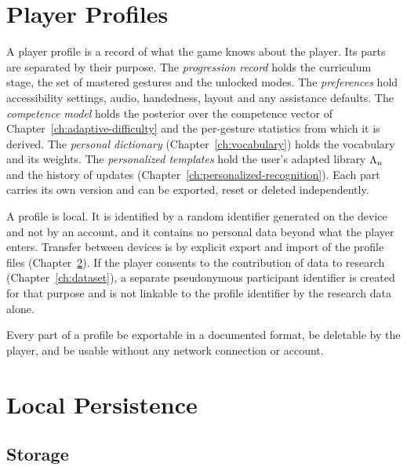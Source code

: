 \chapter{Player Profiles}\label{ch:profiles}

A player profile is a record of what the game knows about the player. Its parts are separated by their purpose. The \emph{progression record} holds the curriculum stage, the set of mastered gestures and the unlocked modes. The \emph{preferences} hold accessibility settings, audio, handedness, layout and any assistance defaults. The \emph{competence model} holds the posterior over the competence vector of Chapter~\ref{ch:adaptive-difficulty} and the per-gesture statistics from which it is derived. The \emph{personal dictionary} (Chapter~\ref{ch:vocabulary}) holds the vocabulary and its weights. The \emph{personalized templates} hold the user's adapted library $\Lambda_u$ and the history of updates (Chapter~\ref{ch:personalized-recognition}). Each part carries its own version and can be exported, reset or deleted independently.

A profile is local. It is identified by a random identifier generated on the device and not by an account, and it contains no personal data beyond what the player enters. Transfer between devices is by explicit export and import of the profile files (Chapter~\ref{ch:persistence}). If the player consents to the contribution of data to research (Chapter~\ref{ch:dataset}), a separate pseudonymous participant identifier is created for that purpose and is not linkable to the profile identifier by the research data alone.

\begin{requirement}\label{req:profile-ownership}
Every part of a profile \must{} be exportable in a documented format, \must{} be deletable by the player, and \must{} be usable without any network connection or account.\evS
\end{requirement}

\chapter{Local Persistence}\label{ch:persistence}

\section{Storage}

